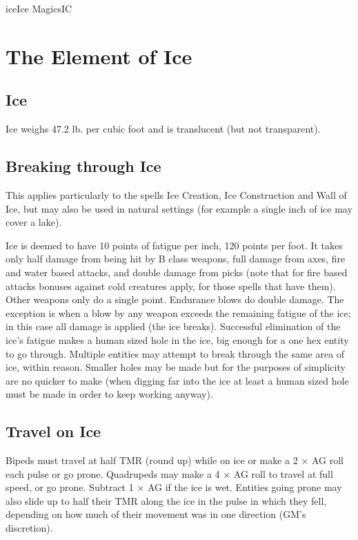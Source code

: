 \begin{College}[1.5]{ice}{Ice Magics}{IC}
\section{The Element of Ice}

\subsection{Ice}

Ice weighs 47.2 lb. per cubic foot and is translucent 
(but not transparent). 

\subsection{Breaking through Ice}

This applies particularly to the spells Ice Creation, Ice Construction
and Wall of Ice, but may also be used in natural settings (for example
a single inch of ice may cover a lake).

Ice is deemed to have 10 points of fatigue per inch, 120 points per
foot. It takes only half damage from being hit by B class weapons,
full damage from axes, fire and water based attacks, and double damage
from picks (note that for fire based attacks bonuses against cold
creatures apply, for those spells that have them).  Other weapons only
do a single point.  Endurance blows do double damage.  The exception
is when a blow by any weapon exceeds the remaining fatigue of the ice;
in this case all damage is applied (the ice breaks).  Successful
elimination of the ice’s fatigue makes a human sized hole in the ice,
big enough for a one hex entity to go through.  Multiple entities may
attempt to break through the same area of ice, within reason.  Smaller
holes may be made but for the purposes of simplicity are no quicker to
make (when digging far into the ice at least a human sized hole must
be made in order to keep working anyway).

\subsection{Travel on Ice}

Bipeds must travel at half TMR (round up) while on ice or make a 2 ×
AG roll each pulse or go prone.  Quadrupeds may make a 4 × AG roll to
travel at full speed, or go prone. Subtract 1 × AG if the ice is wet.
Entities going prone may also slide up to half their TMR along the ice
in the pulse in which they fell, depending on how much of their
movement was in one direction (GM’s discretion).


\end{College}
